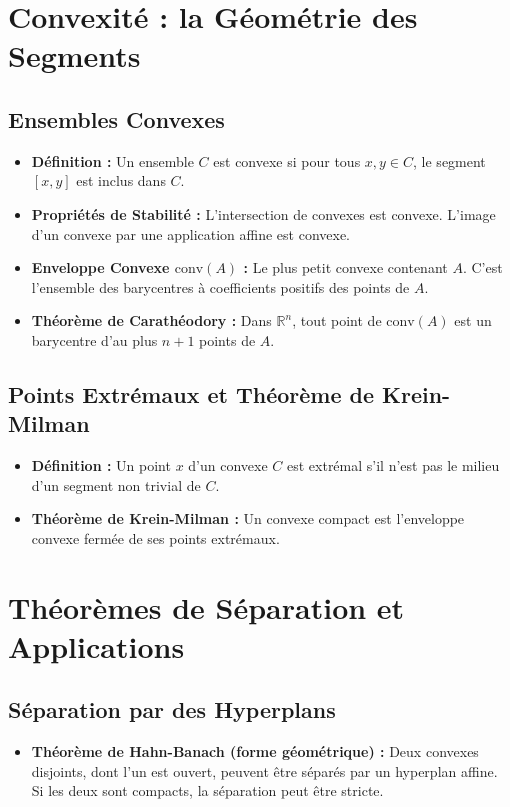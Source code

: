 \documentclass[12pt, a4paper, parskip=full]{report}
\theoremstyle{agregstyle}
\begin{document}
\section{Convexité : la Géométrie des Segments}
\subsection{Ensembles Convexes}
\begin{itemize}
    \item \textbf{Définition :} Un ensemble $C$ est convexe si pour tous $x,y \in C$, le segment $[x,y]$ est inclus dans $C$.
    \item \textbf{Propriétés de Stabilité :} L'intersection de convexes est convexe. L'image d'un convexe par une application affine est convexe.
    \item \textbf{Enveloppe Convexe $\mathrm{conv}(A)$ :} Le plus petit convexe contenant $A$. C'est l'ensemble des barycentres à coefficients positifs des points de $A$.
    \item \textbf{Théorème de Carathéodory :} Dans $\mathbb{R}^n$, tout point de $\mathrm{conv}(A)$ est un barycentre d'au plus $n+1$ points de $A$.
\end{itemize}
\subsection{Points Extrémaux et Théorème de Krein-Milman}
\begin{itemize}
    \item \textbf{Définition :} Un point $x$ d'un convexe $C$ est extrémal s'il n'est pas le milieu d'un segment non trivial de $C$.
    \item \textbf{Théorème de Krein-Milman :} Un convexe compact est l'enveloppe convexe fermée de ses points extrémaux.
\end{itemize}

\section{Théorèmes de Séparation et Applications}
\subsection{Séparation par des Hyperplans}
\begin{itemize}
    \item \textbf{Théorème de Hahn-Banach (forme géométrique) :} Deux convexes disjoints, dont l'un est ouvert, peuvent être séparés par un hyperplan affine. Si les deux sont compacts, la séparation peut être stricte.
\end{itemize}
\end{document}
